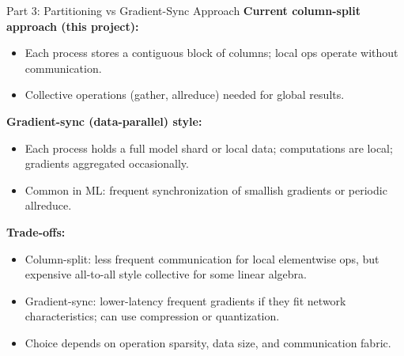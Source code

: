 \documentclass[aspectratio=169]{beamer}
\begin{document}
\begin{frame}{Part 3: Partitioning vs Gradient-Sync Approach}
\textbf{Current column-split approach (this project):}
\begin{itemize}
  \item Each process stores a contiguous block of columns; local ops operate without communication.
  \item Collective operations (gather, allreduce) needed for global results.
\end{itemize}

\textbf{Gradient-sync (data-parallel) style:}
\begin{itemize}
  \item Each process holds a full model shard or local data; computations are local; gradients aggregated occasionally.
  \item Common in ML: frequent synchronization of smallish gradients or periodic allreduce.
\end{itemize}

\textbf{Trade-offs:}
\begin{itemize}
  \item Column-split: less frequent communication for local elementwise ops, but expensive all-to-all style collective for some linear algebra.
  \item Gradient-sync: lower-latency frequent gradients if they fit network characteristics; can use compression or quantization.
  \item Choice depends on operation sparsity, data size, and communication fabric.
\end{itemize}
\end{frame}
\end{document}
